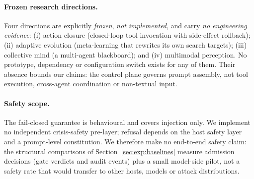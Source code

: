 \paragraph{Frozen research directions.} Four directions are explicitly
\emph{frozen}, \emph{not implemented}, and carry \emph{no engineering evidence}:
(i) action closure (closed-loop tool invocation with side-effect rollback);
(ii) adaptive evolution (meta-learning that rewrites its own search targets);
(iii) collective mind (a multi-agent blackboard); and (iv) multimodal
perception. No prototype, dependency or configuration switch exists
for any of them. Their absence bounds our claims: the control plane
governs prompt assembly, not tool execution, cross-agent coordination or
non-textual input.

\paragraph{Safety scope.} The fail-closed guarantee is behavioural and covers
injection only. We implement no independent crisis-safety pre-layer;
refusal depends on the host safety layer and a prompt-level constitution. We
therefore make no end-to-end safety claim: the structural comparisons of
Section~\ref{sec:exp:baselines} measure admission decisions (gate verdicts and
audit events) plus a small model-side pilot, not a safety rate that would
transfer to other hosts, models or attack distributions.
